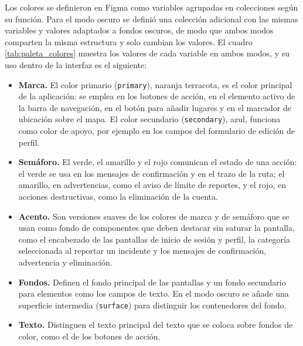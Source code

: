 Los colores se definieron en Figma como variables agrupadas en colecciones según su función. Para el modo oscuro se definió una colección adicional con las mismas variables y valores adaptados a fondos oscuros, de modo que ambos modos comparten la misma estructura y solo cambian los valores. El cuadro \ref{tab:paleta_colores} muestra los valores de cada variable en ambos modos, y su uso dentro de la interfaz es el siguiente:

\begin{itemize}
    \item \textbf{Marca.} El color primario (\texttt{primary}), naranja terracota, es el color principal de la aplicación: se emplea en los botones de acción, en el elemento activo de la barra de navegación, en el botón para añadir lugares y en el marcador de ubicación sobre el mapa. El color secundario (\texttt{secondary}), azul, funciona como color de apoyo, por ejemplo en los campos del formulario de edición de perfil.
    \item \textbf{Semáforo.} El verde, el amarillo y el rojo comunican el estado de una acción: el verde se usa en los mensajes de confirmación y en el trazo de la ruta; el amarillo, en advertencias, como el aviso de límite de reportes, y el rojo, en acciones destructivas, como la eliminación de la cuenta.
    \item \textbf{Acento.} Son versiones suaves de los colores de marca y de semáforo que se usan como fondo de componentes que deben destacar sin saturar la pantalla, como el encabezado de las pantallas de inicio de sesión y perfil, la categoría seleccionada al reportar un incidente y los mensajes de confirmación, advertencia y eliminación.
    \item \textbf{Fondos.} Definen el fondo principal de las pantallas y un fondo secundario para elementos como los campos de texto. En el modo oscuro se añade una superficie intermedia (\texttt{surface}) para distinguir los contenedores del fondo.
    \item \textbf{Texto.} Distinguen el texto principal del texto que se coloca sobre fondos de color, como el de los botones de acción.
\end{itemize}

